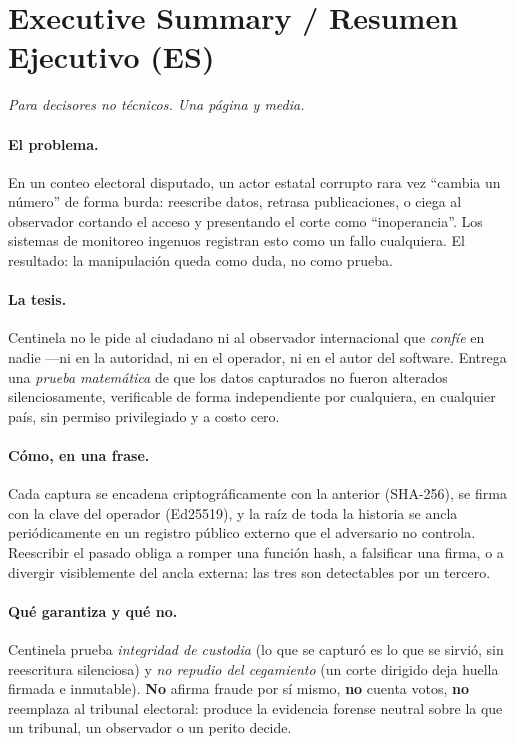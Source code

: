 \documentclass[11pt,a4paper]{article}
\theoremstyle{plain}
\theoremstyle{definition}
\theoremstyle{remark}
\begin{document}
\section*{Executive Summary / Resumen Ejecutivo (ES)}

\noindent\emph{Para decisores no t\'ecnicos. Una p\'agina y media.}

\paragraph{El problema.} En un conteo electoral disputado, un actor
estatal corrupto rara vez ``cambia un n\'umero'' de forma burda: reescribe
datos, retrasa publicaciones, o ciega al observador cortando el acceso y
presentando el corte como ``inoperancia''. Los sistemas de monitoreo
ingenuos registran esto como un fallo cualquiera. El resultado: la
manipulaci\'on queda como duda, no como prueba.

\paragraph{La tesis.} Centinela no le pide al ciudadano ni al observador
internacional que \emph{conf\'ie} en nadie ---ni en la autoridad, ni en el
operador, ni en el autor del software. Entrega una \emph{prueba
matem\'atica} de que los datos capturados no fueron alterados
silenciosamente, verificable de forma independiente por cualquiera, en
cualquier pa\'is, sin permiso privilegiado y a costo cero.

\paragraph{C\'omo, en una frase.} Cada captura se encadena
criptogr\'aficamente con la anterior (SHA-256), se firma con la clave del
operador (Ed25519), y la ra\'iz de toda la historia se ancla
peri\'odicamente en un registro p\'ublico externo que el adversario no
controla. Reescribir el pasado obliga a romper una funci\'on hash, a
falsificar una firma, o a divergir visiblemente del ancla externa: las
tres son detectables por un tercero.

\paragraph{Qu\'e garantiza y qu\'e no.} Centinela prueba
\emph{integridad de custodia} (lo que se captur\'o es lo que se sirvi\'o,
sin reescritura silenciosa) y \emph{no repudio del cegamiento} (un corte
dirigido deja huella firmada e inmutable). \textbf{No} afirma fraude por
s\'i mismo, \textbf{no} cuenta votos, \textbf{no} reemplaza al tribunal
electoral: produce la evidencia forense neutral sobre la que un tribunal,
un observador o un perito decide.
\end{document}
